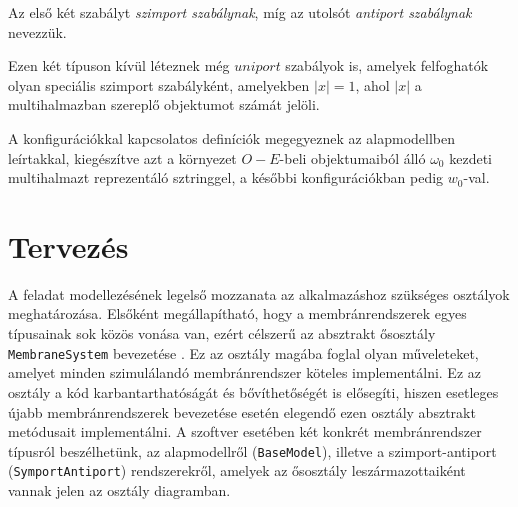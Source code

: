 Az első két szabályt \textit{szimport szabálynak}, míg az utolsót \textit{antiport szabálynak} nevezzük.

\begin{note}
Ezen két típuson kívül léteznek még $uniport$ szabályok is, amelyek felfoghatók olyan speciális szimport szabályként, amelyekben $|x| = 1$, ahol $|x|$ a multihalmazban szereplő objektumot számát jelöli.
\end{note}

A konfigurációkkal kapcsolatos definíciók megegyeznek az alapmodellben leírtakkal, kiegészítve azt a környezet $O-E$-beli objektumaiból álló $\omega_0$ kezdeti multihalmazt reprezentáló sztringgel, a későbbi konfigurációkban pedig $w_0$-val.


\section{Tervezés}

A feladat modellezésének legelső mozzanata az alkalmazáshoz szükséges osztályok meghatározása. Elsőként megállapítható, hogy a membránrendszerek egyes típusainak sok közös vonása van, ezért célszerű az absztrakt ősosztály \verb|MembraneSystem| bevezetése . Ez az osztály magába foglal olyan műveleteket, amelyet minden szimulálandó membránrendszer köteles implementálni. Ez az osztály a kód karbantarthatóságát és bővíthetőségét is elősegíti, hiszen esetleges újabb membránrendszerek bevezetése esetén elegendő ezen osztály absztrakt metódusait implementálni. A szoftver esetében két konkrét membránrendszer típusról beszélhetünk, az alapmodellről (\verb|BaseModel|), illetve a szimport-antiport (\verb|SymportAntiport|)  rendszerekről, amelyek az ősosztály leszármazottaiként vannak jelen az osztály diagramban. 

